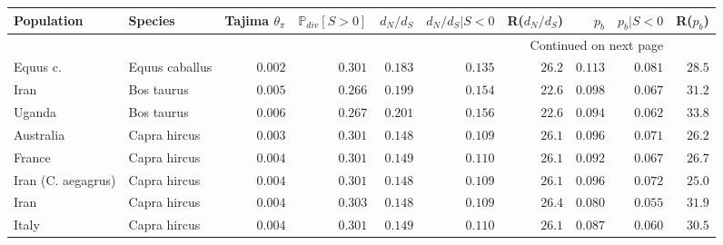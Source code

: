 \documentclass{article}
\newcommand{\dn}{d_N}
\newcommand{\ds}{d_S}
\newcommand{\dnds}{\dn / \ds}
\newcommand{\Sphy}{S}
\begin{document}
    \begin{center}
        \footnotesize
        \begin{longtable}{|l|l|r|r|r|r|r|r|r|r|}
            \toprule
            Population           & Species             & Tajima $\theta_{\pi}$ & $\mathbb{P}_{div}[\Sphy > 0]$ & $\dnds $ & $\dnds  | S<0$ & R($\dnds $) & $p_b $ & $p_b  | S<0$ & R($p_b $) \\
            \midrule
            \endhead
            \midrule
            \multicolumn{9}{r}{{Continued on next page}} \\
            \midrule
            \endfoot

            \bottomrule
            \endlastfoot
            Equus c. &       Equus caballus &               $ 0.002$ &                $ 0.301$ &        $ 0.183$ &              $ 0.135$ &           $  26.2$ & $ 0.113$ &     $ 0.081$ &  $  28.5$ \\
            Iran &           Bos taurus &               $ 0.005$ &                $ 0.266$ &        $ 0.199$ &              $ 0.154$ &           $  22.6$ & $ 0.098$ &     $ 0.067$ &  $  31.2$ \\
            Uganda &           Bos taurus &               $ 0.006$ &                $ 0.267$ &        $ 0.201$ &              $ 0.156$ &           $  22.6$ & $ 0.094$ &     $ 0.062$ &  $  33.8$ \\
            Australia &         Capra hircus &               $ 0.003$ &                $ 0.301$ &        $ 0.148$ &              $ 0.109$ &           $  26.1$ & $ 0.096$ &     $ 0.071$ &  $  26.2$ \\
            France &         Capra hircus &               $ 0.004$ &                $ 0.301$ &        $ 0.149$ &              $ 0.110$ &           $  26.1$ & $ 0.092$ &     $ 0.067$ &  $  26.7$ \\
            Iran (C. aegagrus) &         Capra hircus &               $ 0.004$ &                $ 0.301$ &        $ 0.148$ &              $ 0.109$ &           $  26.1$ & $ 0.096$ &     $ 0.072$ &  $  25.0$ \\
            Iran &         Capra hircus &               $ 0.004$ &                $ 0.303$ &        $ 0.148$ &              $ 0.109$ &           $  26.4$ & $ 0.080$ &     $ 0.055$ &  $  31.9$ \\
            Italy &         Capra hircus &               $ 0.004$ &                $ 0.301$ &        $ 0.149$ &              $ 0.110$ &           $  26.1$ & $ 0.087$ &     $ 0.060$ &  $  30.5$ \\

\end{longtable}
\end{center}
\end{document}
